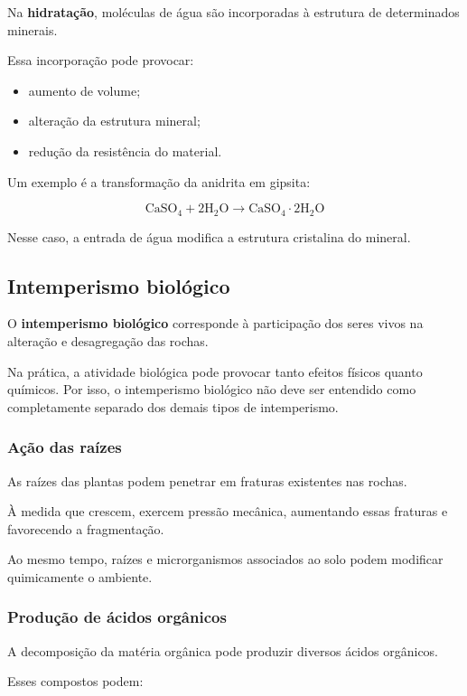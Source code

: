 \documentclass[a4paper,12pt]{article}
\theoremstyle{definition}
\theoremstyle{definition}
\theoremstyle{definition}
\begin{document}
Na \textbf{hidratação}, moléculas de água são incorporadas à estrutura de determinados minerais.

Essa incorporação pode provocar:

\begin{itemize}
    \item aumento de volume;
    \item alteração da estrutura mineral;
    \item redução da resistência do material.
\end{itemize}

Um exemplo é a transformação da anidrita em gipsita:

\[
\mathrm{CaSO_4 + 2H_2O
\rightarrow
CaSO_4\cdot 2H_2O}
\]

Nesse caso, a entrada de água modifica a estrutura cristalina do mineral.

\subsection{Intemperismo biológico}

O \textbf{intemperismo biológico} corresponde à participação dos seres vivos na alteração e desagregação das rochas.

Na prática, a atividade biológica pode provocar tanto efeitos físicos quanto químicos. Por isso, o intemperismo biológico não deve ser entendido como completamente separado dos demais tipos de intemperismo.

\subsubsection{Ação das raízes}

As raízes das plantas podem penetrar em fraturas existentes nas rochas.

À medida que crescem, exercem pressão mecânica, aumentando essas fraturas e favorecendo a fragmentação.

Ao mesmo tempo, raízes e microrganismos associados ao solo podem modificar quimicamente o ambiente.

\subsubsection{Produção de ácidos orgânicos}

A decomposição da matéria orgânica pode produzir diversos ácidos orgânicos.

Esses compostos podem:
\end{document}
